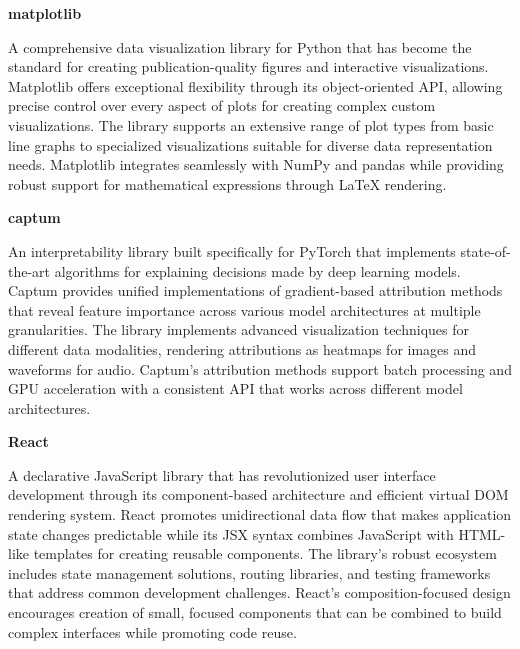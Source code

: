 \documentclass[
    bindingoffset=5mm,  %
    footnoteindent=3mm, %
    hyphenation=true    %
]{src/wut-thesis}
\begin{document}
\begin{description}
\item \textbf{matplotlib}

A comprehensive data visualization library for Python that has become the standard for creating publication-quality figures and interactive visualizations. Matplotlib offers exceptional flexibility through its object-oriented API, allowing precise control over every aspect of plots for creating complex custom visualizations. The library supports an extensive range of plot types from basic line graphs to specialized visualizations suitable for diverse data representation needs. Matplotlib integrates seamlessly with NumPy and pandas while providing robust support for mathematical expressions through LaTeX rendering.

\item \textbf{captum}

An interpretability library built specifically for PyTorch that implements state-of-the-art algorithms for explaining decisions made by deep learning models. Captum provides unified implementations of gradient-based attribution methods that reveal feature importance across various model architectures at multiple granularities. The library implements advanced visualization techniques for different data modalities, rendering attributions as heatmaps for images and waveforms for audio. Captum's attribution methods support batch processing and GPU acceleration with a consistent API that works across different model architectures.

\item \textbf{React}

A declarative JavaScript library that has revolutionized user interface development through its component-based architecture and efficient virtual DOM rendering system. React promotes unidirectional data flow that makes application state changes predictable while its JSX syntax combines JavaScript with HTML-like templates for creating reusable components. The library's robust ecosystem includes state management solutions, routing libraries, and testing frameworks that address common development challenges. React's composition-focused design encourages creation of small, focused components that can be combined to build complex interfaces while promoting code reuse.
\end{description}

%
%
\clearpage %
\end{document}
